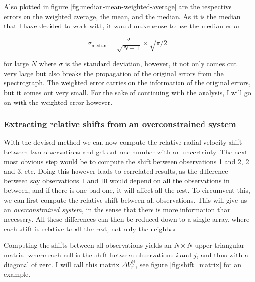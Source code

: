     Also plotted in figure \ref{fig:median-mean-weighted-average} are the respective errors on the weighted average, the mean, and the median. As it is the median that I have decided to work with, it would make sense to use the median error 
    
    $$
        \sigma_{\text{median}} = \frac{\sigma}{\sqrt{N-1}} \times \sqrt{\pi/2}
    $$
    
    for large $N$ where $\sigma$ is the standard deviation, however, it not only comes out very large but also breaks the propagation of the original errors from the spectrograph. The weighted error carries on the information of the original errors, but it comes out very small. For the sake of continuing with the analysis, I will go on with the weighted error however.
    
    \subsubsection{Extracting relative shifts from an overconstrained system}
    
    With the devised method we can now compute the relative radial velocity shift between two observations and get out one number with an uncertainty. The next most obvious step would be to compute the shift between observations 1 and 2, 2 and 3, etc. Doing this however leads to correlated results, as the difference between say observations 1 and 10 would depend on all the observations in between, and if there is one bad one, it will affect all the rest. To circumvent this, we can first compute the relative shift between all observations. This will give us an \emph{overconstrained system}, in the sense that there is more information than necessary. All these differences can then be reduced down to a single array, where each shift is relative to all the rest, not only the neighbor. 
    
    Computing the shifts between all observations yields an $N\times N$ upper triangular matrix, where each cell is the shift between observations $i$ and $j$, and thus with a diagonal of zero. I will call this matrix $\Delta V_r^{ij}$, see figure \ref{fig:shift_matrix} for an example.
    
